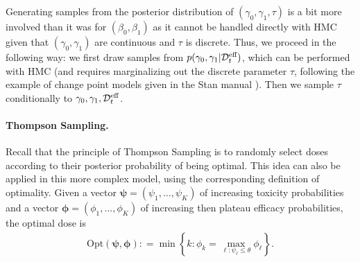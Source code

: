 
Generating samples from the posterior distribution of $(\gamma_0,\gamma_1,\tau)$ is a bit more involved than it was for $(\beta_0,\beta_1)$ as it cannot be handled directly with HMC given that $(\gamma_0,\gamma_1)$ are continuous and $\tau$ is discrete. Thus, we proceed in the following way: we first draw samples from $p(\gamma_0,\gamma_1 |\mathcal{D}^{\text{eff}}_t)$, which can be performed with HMC (and requires marginalizing out the discrete parameter $\tau$, following the example of change point models given in the Stan manual \citep{StanManual}). Then we sample $\tau$ conditionally to $\gamma_0,\gamma_1,\mathcal{D}^{\text{eff}}_t$.


\paragraph{Thompson Sampling.}

Recall that the principle of Thompson Sampling is to randomly select doses according to their posterior probability of being optimal. This idea can also be applied in this more complex model, using the corresponding definition of optimality. Given a vector $\bm\psi = (\psi_1,\dots,\psi_K)$ of increasing toxicity probabilities and a vector $\bm\phi = (\phi_1,\dots,\phi_K)$ of increasing then plateau efficacy probabilities, the optimal dose is 
\begin{align}\label{optEmp}
{\mathrm{Opt}}(\bm{\psi},\bm{\phi}) : = \min\left\{
    k : \phi_k = \max_{\ell : \psi_\ell \leq \theta} \phi_\ell \right\}.
\end{align}

